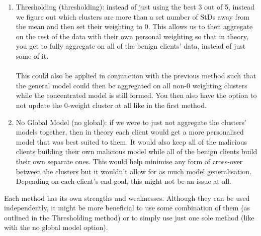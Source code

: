 \begin{enumerate}
    \item Thresholding (thresholding): instead of just using the best 3 out of 5, instead we figure out which clusters are more than a set number of StDs away from the mean and then set their weighting to 0.
    This allows us to then aggregate on the rest of the data with their own personal weighting so that in theory, you get to fully aggregate on all of the benign clients' data, instead of just some of it.
    \\ \\
    This could also be applied in conjunction with the previous method such that the general model could then be aggregated on all non-0 weighting clusters while the concentrated model is still formed.
    You then also have the option to not update the 0-weight cluster at all like in the first method.
    
    \item No Global Model (no global): if we were to just not aggregate the clusters' models together, then in theory each client would get a more personalised model that was best suited to them.
    It would also keep all of the malicious clients building their own malicious model while all of the benign clients build their own separate ones.
    This would help minimise any form of cross-over between the clusters but it wouldn't allow for as much model generalisation.
    Depending on each client's end goal, this might not be an issue at all.
\end{enumerate}

Each method has its own strengths and weaknesses.
Although they can be used independently, it might be more beneficial to use some combination of them (as outlined in the Thresholding method) or to simply use just one sole method (like with the no global model option).


